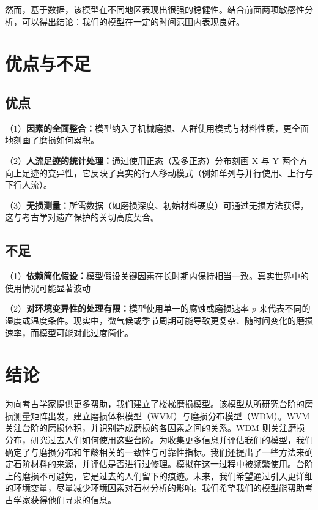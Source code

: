 \documentclass[11pt,a4paper]{ctexart}
\begin{document}
然而，基于数据，该模型在不同地区表现出很强的稳健性。结合前面两项敏感性分析，可以得出结论：我们的模型在一定的时间范围内表现良好。

\section{优点与不足}

\subsection{优点}

（1）\textbf{因素的全面整合：}模型纳入了机械磨损、人群使用模式与材料性质，更全面地刻画了磨损如何累积。

（2）\textbf{人流足迹的统计处理：}通过使用正态（及多正态）分布刻画 X 与 Y 两个方向上足迹的变异性，它反映了真实的行人移动模式（例如单列与并行使用、上行与下行人流）。

（3）\textbf{无损测量：}所需数据（如磨损深度、初始材料硬度）可通过无损方法获得，这与考古学对遗产保护的关切高度契合。

\subsection{不足}

（1）\textbf{依赖简化假设：}模型假设关键因素在长时期内保持相当一致。真实世界中的使用情况可能显著波动

（2）\textbf{对环境变异性的处理有限：}模型使用单一的腐蚀或磨损速率 \(p\) 来代表不同的湿度或温度条件。现实中，微气候或季节周期可能导致更复杂、随时间变化的磨损速率，而模型可能对此过度简化。

\section{结论}

为向考古学家提供更多帮助，我们建立了楼梯磨损模型。该模型从所研究台阶的磨损测量矩阵出发，建立磨损体积模型（WVM）与磨损分布模型（WDM）。WVM 关注台阶的磨损体积，并识别造成磨损的各因素之间的关系。WDM 则关注磨损分布，研究过去人们如何使用这些台阶。为收集更多信息并评估我们的模型，我们确定了与磨损分布和年龄相关的一致性与可靠性指标。我们还提出了一些方法来确定石阶材料的来源，并评估是否进行过修理。模拟在这一过程中被频繁使用。台阶上的磨损不可避免，它是过去的人们留下的痕迹。未来，我们希望通过引入更详细的环境变量，尽量减少环境因素对石材分析的影响。我们希望我们的模型能帮助考古学家获得他们寻求的信息。
\end{document}
